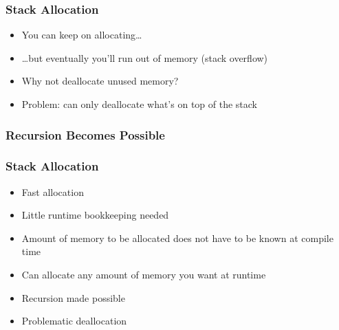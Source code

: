 \documentclass{../ucll-slides}
\newenvironment{procontralist}{
  \begingroup
  \newcommand{\pro}{\item[\Checkmark]}
  \newcommand{\con}{\item[\XSolidBrush]}
  \begin{itemize}
  }{
  \end{itemize}
  \endgroup}
\begin{document}
\begin{frame}
  \frametitle{Stack Allocation}
  \begin{itemize}
    \item You can keep on allocating\dots
    \item \dots but eventually you'll run out of memory (stack overflow)
    \item Why not deallocate unused memory?
    \item Problem: can only deallocate what's on top of the stack
  \end{itemize}
\end{frame}

\begin{frame}
  \frametitle{Recursion Becomes Possible}
  \begin{center}
  \end{center}
\end{frame}

\begin{frame}
  \frametitle{Stack Allocation}
  \begin{procontralist}
    \pro Fast allocation
    \pro Little runtime bookkeeping needed
    \pro Amount of memory to be allocated does not have to be known at compile time
    \pro Can allocate any amount of memory you want at runtime
    \pro Recursion made possible
    \con Problematic deallocation
  \end{procontralist}
\end{frame}
\end{document}
